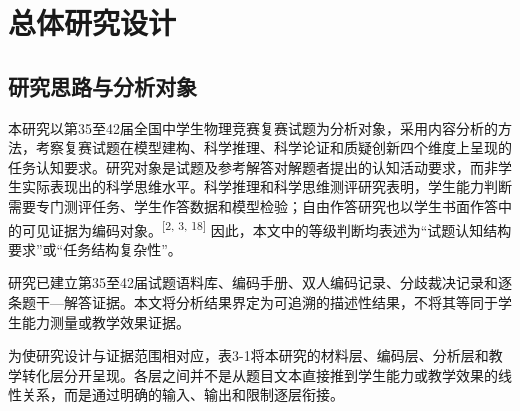 \documentclass[
  12pt,
  a4paper]{ctexbook}
\begin{document}
\section{总体研究设计}\label{ux603bux4f53ux7814ux7a76ux8bbeux8ba1}

\subsection{研究思路与分析对象}\label{ux7814ux7a76ux601dux8defux4e0eux5206ux6790ux5bf9ux8c61}

本研究以第35至42届全国中学生物理竞赛复赛试题为分析对象，采用内容分析的方法，考察复赛试题在模型建构、科学推理、科学论证和质疑创新四个维度上呈现的任务认知要求。研究对象是试题及参考解答对解题者提出的认知活动要求，而非学生实际表现出的科学思维水平。科学推理和科学思维测评研究表明，学生能力判断需要专门测评任务、学生作答数据和模型检验；自由作答研究也以学生书面作答中的可见证据为编码对象。\textsuperscript{[2, 3, 18]}
因此，本文中的等级判断均表述为``试题认知结构要求''或``任务结构复杂性''。

研究已建立第35至42届试题语料库、编码手册、双人编码记录、分歧裁决记录和逐条题干---解答证据。本文将分析结果界定为可追溯的描述性结果，不将其等同于学生能力测量或教学效果证据。

为使研究设计与证据范围相对应，表3-1将本研究的材料层、编码层、分析层和教学转化层分开呈现。各层之间并不是从题目文本直接推到学生能力或教学效果的线性关系，而是通过明确的输入、输出和限制逐层衔接。
\end{document}
